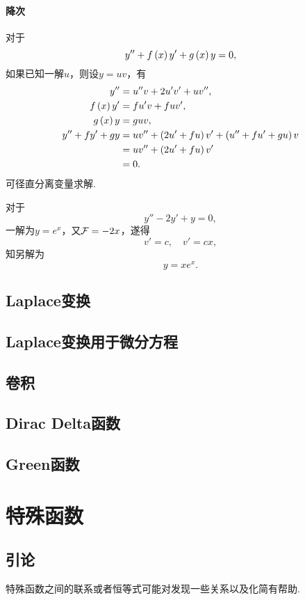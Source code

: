 \documentclass[UTF-8]{ctexart}
\begin{document}
  \paragraph{降次}对于
  \[ y''+f\left(x\right)y'+g\left(x\right)y=0, \]如果已知一解$u$，则设$y=uv$，有
  \begin{align*}
    y'' &= u''v + 2u'v' + uv'',\\
    f\left(x\right)y' &= fu'v + fuv',\\
    g\left(x\right)y &= guv, \\
    y'' + fy' + gy &= uv'' + \left(2u'+fu\right)v' + \left(u''+fu'+gu\right)v\\
    &= uv''+\left(2u'+fu\right)v'\\
    &= 0.
  \end{align*}
  可径直分离变量求解.
  \begin{ex}
     对于\[ y'' - 2y' + y = 0, \]
     一解为$y=e^x$，又$\mathcal{F} = -2x$，遂得
     \[ v'=c, \quad v' = cx, \]
     知另解为
     \[ y = xe^x. \]
  \end{ex}
  \subsection{Laplace变换}
  \subsection{Laplace变换用于微分方程}
  \subsection{卷积}
  \subsection{Dirac Delta函数}
  \subsection{Green函数}
  \section{特殊函数}
  \subsection{引论}
  特殊函数之间的联系或者恒等式可能对发现一些关系以及化简有帮助.
\end{document}
